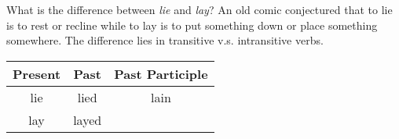 
What is the difference between \textit{lie} and \textit{lay}? An old comic conjectured that to lie is to rest or recline while to lay is to put something down or place something somewhere. The difference lies in transitive v.s. intransitive verbs. 

\noindent
\begin{center}
\begin{tabular}{|c|c|c|}
    \hline
    \textbf{Present} & \textbf{Past} & \textbf{Past Participle} \\
    \hline
    lie & lied & lain \\
    \hline
     lay & layed &  \\
    \hline
\end{tabular}
\end{center}


